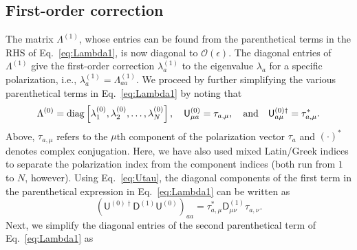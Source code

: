 \subsection{First-order correction}

The matrix $\Lambda^{(1)}$, whose entries can be found from the parenthetical terms in the RHS of Eq.~\eqref{eq:Lambda1}, is now diagonal to $\mathcal{O}(\epsilon)$.
The diagonal entries of $\Lambda^{(1)}$ give the first-order correction $\lambda_{a}^{(1)}$ to the eigenvalue $\lambda_{a}$ for a specific polarization, i.e., $\lambda_{a}^{(1)} = \Lambda^{(1)}_{aa}$.
We proceed by further simplifying the various parenthetical terms in Eq.~\eqref{eq:Lambda1} by noting that
%
\begin{equation}
  \Lambda^{(0)} = \operatorname{diag}\left[\lambda^{(0)}_{1}, \lambda^{(0)}_{2}, \ldots, \lambda^{(0)}_{N}\right],
  \quad
  \mathsf{U}^{(0)}_{\mu a} = \tau_{a, \mu},
  \quad\text{and}\quad
  \mathsf{U}^{(0)\dagger}_{a \mu} = \tau^{*}_{a, \mu}.
  \label{eq:Utau}
\end{equation}
%
Above, $\tau_{a, \mu}$ refers to the $\mu$th component of the polarization vector $\tau_{a}$ and $(\cdot)^{*}$ denotes complex conjugation.
Here, we have also used mixed Latin/Greek indices to separate the polarization index from the component indices (both run from $1$ to $N$, however).
Using Eq.~\eqref{eq:Utau}, the diagonal components of the first term in the parenthetical expression in Eq.~\eqref{eq:Lambda1} can be written as
%
\begin{equation}
\left(\mathsf{U}^{(0)\dagger}\mathsf{D}^{(1)}\mathsf{U}^{(0)}\right)_{aa} = \tau_{a,\mu}^{*}\mathsf{D}^{(1)}_{\mu\nu}\tau_{a,\nu}.
\label{eq:1st_term}
\end{equation}
%
Next, we simplify the diagonal entries of the second parenthetical term of Eq.~\eqref{eq:Lambda1} as
%
